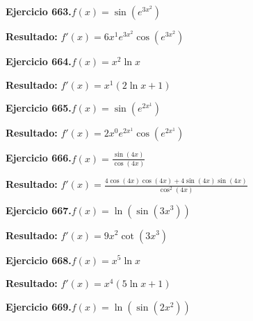 \documentclass[10pt,a4paper]{article}
\begin{document}
\begin{ejbox}
\textbf{Ejercicio 663.}\quad $f(x) = \sin(e^{3x^{2}})$
\end{ejbox}

\begin{solbox}
\textbf{Resultado:} \(\displaystyle f'(x) = 6x^{1}e^{3x^{2}}\cos(e^{3x^{2}})\)
\end{solbox}

\newpage
\begin{ejbox}
\textbf{Ejercicio 664.}\quad $f(x) = x^{2} \ln x$
\end{ejbox}

\begin{solbox}
\textbf{Resultado:} \(\displaystyle f'(x) = x^{1}(2\ln x + 1)\)
\end{solbox}

\begin{ejbox}
\textbf{Ejercicio 665.}\quad $f(x) = \sin(e^{2x^{1}})$
\end{ejbox}

\begin{solbox}
\textbf{Resultado:} \(\displaystyle f'(x) = 2x^{0}e^{2x^{1}}\cos(e^{2x^{1}})\)
\end{solbox}

\begin{ejbox}
\textbf{Ejercicio 666.}\quad $f(x) = \frac{\sin(4x)}{\cos(4x)}$
\end{ejbox}

\begin{solbox}
\textbf{Resultado:} \(\displaystyle f'(x) = \frac{4\cos(4x)\cos(4x) + 4\sin(4x)\sin(4x)}{\cos^2(4x)}\)
\end{solbox}

\newpage
\begin{ejbox}
\textbf{Ejercicio 667.}\quad $f(x) = \ln(\sin(3x^{3}))$
\end{ejbox}

\begin{solbox}
\textbf{Resultado:} \(\displaystyle f'(x) = 9x^{2}\cot(3x^{3})\)
\end{solbox}

\begin{ejbox}
\textbf{Ejercicio 668.}\quad $f(x) = x^{5} \ln x$
\end{ejbox}

\begin{solbox}
\textbf{Resultado:} \(\displaystyle f'(x) = x^{4}(5\ln x + 1)\)
\end{solbox}

\begin{ejbox}
\textbf{Ejercicio 669.}\quad $f(x) = \ln(\sin(2x^{2}))$
\end{ejbox}
\end{document}

